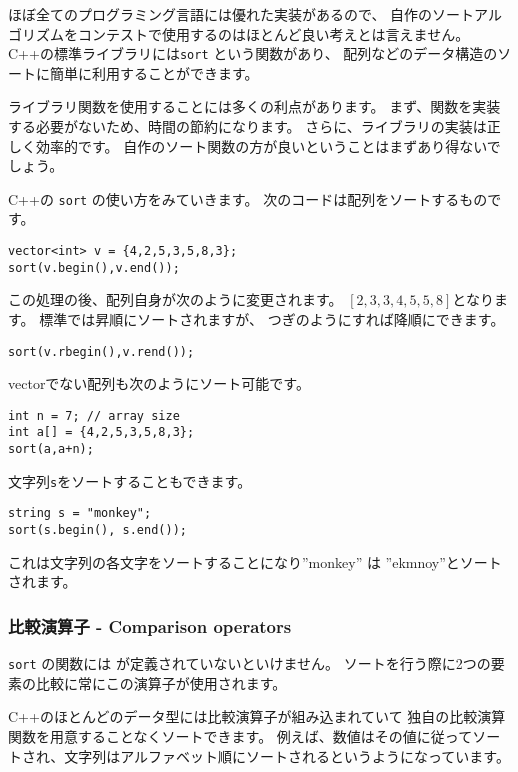 
ほぼ全てのプログラミング言語には優れた実装があるので、
自作のソートアルゴリズムをコンテストで使用するのはほとんど良い考えとは言えません。
C++の標準ライブラリには\texttt{sort} という関数があり、
配列などのデータ構造のソートに簡単に利用することができます。

ライブラリ関数を使用することには多くの利点があります。
まず、関数を実装する必要がないため、時間の節約になります。
さらに、ライブラリの実装は正しく効率的です。
自作のソート関数の方が良いということはまずあり得ないでしょう。

C++の \texttt{sort} の使い方をみていきます。
次のコードは配列をソートするものです。
\begin{lstlisting}
vector<int> v = {4,2,5,3,5,8,3};
sort(v.begin(),v.end());
\end{lstlisting}
この処理の後、配列自身が次のように変更されます。
$[2,3,3,4,5,5,8]$となります。
標準では昇順にソートされますが、
つぎのようにすれば降順にできます。
\begin{lstlisting}
sort(v.rbegin(),v.rend());
\end{lstlisting}
vectorでない配列も次のようにソート可能です。
\begin{lstlisting}
int n = 7; // array size
int a[] = {4,2,5,3,5,8,3};
sort(a,a+n);
\end{lstlisting}
\newpage
文字列\texttt{s}をソートすることもできます。
\begin{lstlisting}
string s = "monkey";
sort(s.begin(), s.end());
\end{lstlisting}
これは文字列の各文字をソートすることになり''monkey'' は ''ekmnoy''とソートされます。

\subsubsection{比較演算子 - Comparison operators}


\texttt{sort} の関数には
が定義されていないといけません。
ソートを行う際に2つの要素の比較に常にこの演算子が使用されます。

C++のほとんどのデータ型には比較演算子が組み込まれていて
独自の比較演算関数を用意することなくソートできます。
例えば、数値はその値に従ってソートされ、文字列はアルファベット順にソートされるというようになっています。



